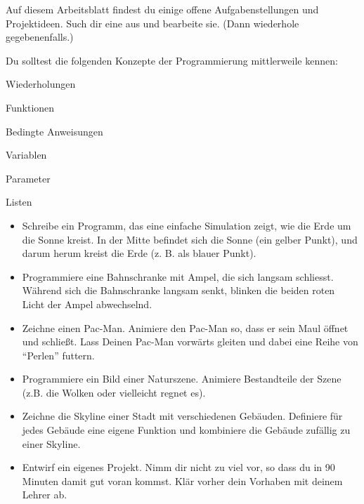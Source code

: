 \documentclass[9pt, a5paper]{arbeitsblatt}
\begin{document}
\ReiheTitel

Auf diesem Arbeitsblatt findest du einige offene Aufgabenstellungen und Projektideen. Such dir eine aus und bearbeite sie. (Dann wiederhole gegebenenfalls.)

Du solltest die folgenden Konzepte der Programmierung mittlerweile kennen:
\begin{multicols}{3}\centering
	Wiederholungen

	Funktionen

	Bedingte Anweisungen

	Variablen

	Parameter

	Listen
\end{multicols}

\begin{itemize}
	\item Schreibe ein Programm, das eine einfache Simulation zeigt, wie die Erde um die Sonne kreist. In der Mitte befindet sich die Sonne (ein gelber Punkt), und darum herum kreist die Erde (z. B. als blauer Punkt).

	\item Programmiere eine Bahnschranke mit Ampel, die sich langsam schliesst. Während sich die Bahnschranke langsam senkt, blinken die beiden roten Licht der Ampel abwechselnd.

	\item Zeichne einen Pac-Man. Animiere den Pac-Man so, dass er sein Maul öffnet und schließt. Lass Deinen Pac-Man vorwärts gleiten und dabei eine Reihe von \enquote{Perlen} futtern.

	\item Programmiere ein Bild einer Naturszene. Animiere Bestandteile der Szene (z.B. die Wolken oder vielleicht regnet es).

	\item Zeichne die Skyline einer Stadt mit verschiedenen Gebäuden. Definiere für jedes Gebäude eine eigene Funktion und kombiniere die Gebäude zufällig zu einer Skyline.

	\item Entwirf ein eigenes Projekt. Nimm dir nicht zu viel vor, so dass du in 90 Minuten damit gut voran kommst. Klär vorher dein Vorhaben mit deinem Lehrer ab.
\end{itemize}
\end{document}

